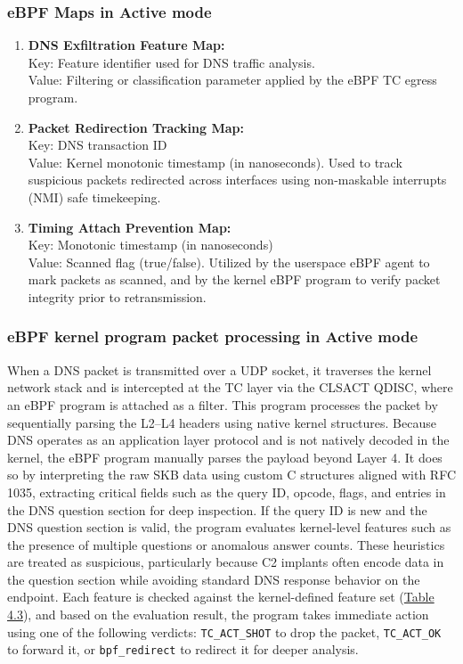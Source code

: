 \documentclass [11pt, proquest] {uwthesis}[2020/02/24]
\begin{document}
\subsubsection{\textbf{eBPF Maps in Active mode}}
\begin{enumerate}[itemsep=1pt,parsep=0pt]
\label{sec:maps}
\item \textbf{DNS Exfiltration Feature Map:} \\
Key: Feature identifier used for DNS traffic analysis. \\
Value: Filtering or classification parameter applied by the eBPF TC egress program.

\item \textbf{Packet Redirection Tracking Map:} \\
Key: DNS transaction ID \\
Value: Kernel monotonic timestamp (in nanoseconds). Used to track suspicious packets redirected across interfaces using non-maskable interrupts (NMI) safe timekeeping.

\item \textbf{Timing Attach Prevention Map:} \\
Key: Monotonic timestamp (in nanoseconds) \\
Value: Scanned flag (true/false). Utilized by the userspace eBPF agent to mark packets as scanned, and by the kernel eBPF program to verify packet integrity prior to retransmission.
\end{enumerate}




\subsubsection{\textbf{eBPF kernel program packet processing in \textbf{Active} mode}}
\label{active:sec1}
When a DNS packet is transmitted over a UDP socket, it traverses the kernel network stack and is intercepted at the TC layer via the CLSACT QDISC, where an eBPF program is attached as a filter. This program processes the packet by sequentially parsing the L2–L4 headers using native kernel structures. Because DNS operates as an application layer protocol and is not natively decoded in the kernel, the eBPF program manually parses the payload beyond Layer 4. It does so by interpreting the raw SKB data using custom C structures aligned with RFC 1035, extracting critical fields such as the query ID, opcode, flags, and entries in the DNS question section for deep inspection.
If the query ID is new and the DNS question section is valid, the program evaluates kernel-level features such as the presence of multiple questions or anomalous answer counts. These heuristics are treated as suspicious, particularly because C2 implants often encode data in the question section while avoiding standard DNS response behavior on the endpoint. Each feature is checked against the kernel-defined feature set (\hyperref[sec:feature-kernel]{Table 4.3}), and based on the evaluation result, the program takes immediate action using one of the following verdicts: \texttt{TC\_ACT\_SHOT} to drop the packet, \texttt{TC\_ACT\_OK} to forward it, or \texttt{bpf\_redirect} to redirect it for deeper analysis.
\end{document}
